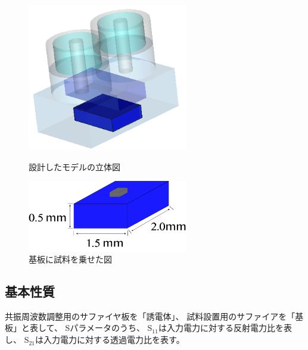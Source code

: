 \vspace{10 mm}

\begin{figure}[h]
 \begin{minipage}{0.5\hsize}
  \begin{center}
   \includegraphics[width=70mm]{./image/model73.png}
  \end{center}
  \caption{設計したモデルの立体図}
  \label{fig:one}
 \end{minipage}
 \begin{minipage}{0.5\hsize}
  \begin{center}
   \includegraphics[width=70mm]{./image/基板資料あり.png}
  \end{center}
  \caption{基板に試料を乗せた図}
  \label{fig:two}
 \end{minipage}
\end{figure}


\subsection*{基本性質}
共振周波数調整用のサファイヤ板を「誘電体」、
試料設置用のサファイアを「基板」と表して、
Sパラメータのうち、
S$_{11}$は入力電力に対する反射電力比を表し、
S$_{21}$は入力電力に対する透過電力比を表す。


